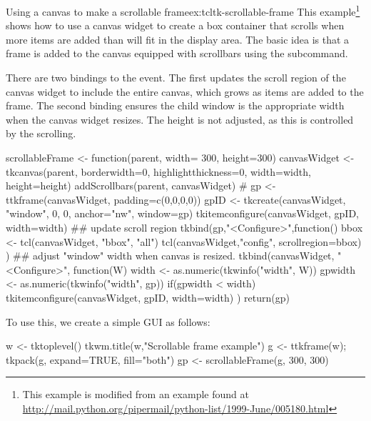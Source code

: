 \begin{example}{Using a canvas to make a scrollable frame}{ex:tcltk-scrollable-frame}
This example\footnote{This example is modified from an example found
  at \url{
    http://mail.python.org/pipermail/python-list/1999-June/005180.html}}
shows how to use a canvas widget to create a box container that
scrolls when more items are added than will fit in the display
area. The basic idea is that a frame is added to the canvas equipped
with scrollbars using the 
subcommand. 

There are two bindings to the  event. The first
updates the scroll region of the canvas widget to include the entire
canvas, which grows as items are added to the frame. The second
binding ensures the child window is the appropriate width when the
canvas widget resizes. The height is not adjusted, as this is
controlled by the scrolling.

\begin{Schunk}
\begin{Sinput}
 scrollableFrame <- function(parent, width= 300, height=300) {
   canvasWidget <- 
     tkcanvas(parent,
              borderwidth=0, highlightthickness=0,
              width=width, height=height)
   addScrollbars(parent, canvasWidget)
   #
   gp <- ttkframe(canvasWidget, padding=c(0,0,0,0))
   gpID <- tkcreate(canvasWidget, "window", 0, 0, anchor="nw", 
                    window=gp)
   tkitemconfigure(canvasWidget, gpID, width=width)
   ## update scroll region
   tkbind(gp,"<Configure>",function() {  
     bbox <- tcl(canvasWidget, "bbox", "all")
     tcl(canvasWidget,"config", scrollregion=bbox)
   })
   ## adjust "window" width when canvas is resized.
   tkbind(canvasWidget, "<Configure>", function(W) {
     width <- as.numeric(tkwinfo("width", W))
     gpwidth <- as.numeric(tkwinfo("width", gp))
     if(gpwidth < width)
       tkitemconfigure(canvasWidget, gpID, width=width)
   })
   return(gp)
 }
\end{Sinput}
\end{Schunk}

To use this, we create a simple GUI as follows:
\begin{Schunk}
\begin{Sinput}
 w <- tktoplevel()
 tkwm.title(w,"Scrollable frame example")
 g <- ttkframe(w); tkpack(g, expand=TRUE, fill="both")
 gp <- scrollableFrame(g, 300, 300)
\end{Sinput}
\end{Schunk}


\end{example}

